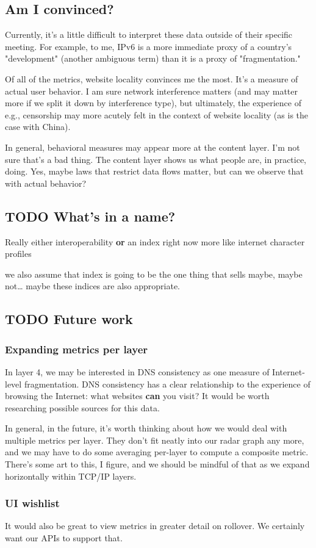 \documentclass[11pt]{article}
\begin{document}
\subsection{Am I convinced?}
\label{sec:org0e894b6}

Currently, it's a little difficult to interpret these data outside of their
specific meeting. For example, to me, IPv6 is a more immediate proxy of a
country's "development" (another ambiguous term) than it is a proxy of
"fragmentation."

Of all of the metrics, website locality convinces me the most. It's a measure of
actual user behavior. I am sure network interference matters (and may matter
more if we split it down by interference type), but ultimately, the experience
of e.g., censorship may more acutely felt in the context of website locality (as
is the case with China).

In general, behavioral measures may appear more at the content layer. I'm not
sure that's a bad thing. The content layer shows us what people are, in
practice, doing. Yes, maybe laws that restrict data flows matter, but can we
observe that with actual behavior?

\subsection{{\bfseries\sffamily TODO} What's in a name?}
\label{sec:orgb37c73d}
Really either interoperability \textbf{or} an index right now
more like internet character profiles

we also assume that index is going to be the one thing that sells
maybe, maybe not\ldots{} maybe these indices are also appropriate.
\subsection{{\bfseries\sffamily TODO} Future work}
\label{sec:org4e1fc05}
\subsubsection{Expanding metrics per layer}
\label{sec:orge3cc0c5}

In layer 4, we may be interested in DNS consistency as one measure of
Internet-level fragmentation. DNS consistency has a clear relationship to the
experience of browsing the Internet: what websites \textbf{can} you visit? It would be
worth researching possible sources for this data.

In general, in the future, it's worth thinking about how we would deal with
multiple metrics per layer. They don't fit neatly into our radar graph any more,
and we may have to do some averaging per-layer to compute a composite metric.
There's some art to this, I figure, and we should be mindful of that as we
expand horizontally within TCP/IP layers.
\subsubsection{UI wishlist}
\label{sec:org1d74458}

It would also be great to view metrics in greater detail on rollover. We
certainly want our APIs to support that.
\end{document}

